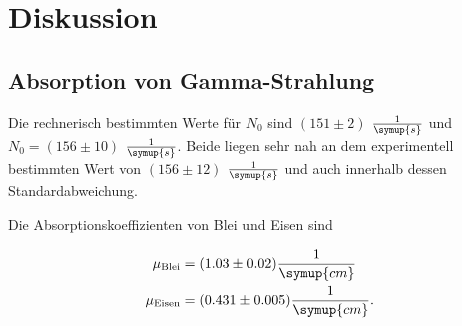 \section{Diskussion}
\label{sec:Diskussion}

\subsection{Absorption von Gamma-Strahlung}

Die rechnerisch bestimmten Werte für $N_0$ sind $(151 \pm 2)$ $\frac{1}{\symup{s}}$ und $N_0 = (156 \pm 10)$ $\frac{1}{\symup{s}}$. 
Beide liegen sehr nah an dem experimentell bestimmten Wert von $(156 \pm 12)$ $\frac{1}{\symup{s}}$ und auch innerhalb dessen Standardabweichung.

Die Absorptionskoeffizienten von Blei und Eisen sind

\begin{align}
    \mu_\text{Blei} &= (1.03 \pm 0.02) \frac{1}{\symup{cm}}\\
    \mu_\text{Eisen} &= (0.431 \pm 0.005) \frac{1}{\symup{cm}}.
\end{align}